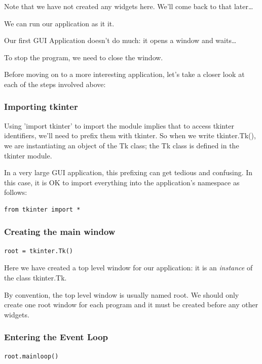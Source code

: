 \documentclass{article}
\begin{document}
Note that we have not created any widgets here.  We’ll come back to that later…

We can run our application as it it.   

Our first GUI Application doesn't do much:  it opens a window and waits…

To stop the program, we need to  close the window.

Before moving on to a more interesting application, let's take a closer look at each of the steps involved above:

\subsubsection{Importing tkinter}

Using 'import tkinter' to import the module implies that to access tkinter identifiers, we'll need to prefix them with tkinter.  So when we write tkinter.Tk(), we are instantiating an object of the Tk class; the Tk class is defined in the tkinter module. 

In a very large GUI application, this prefixing can get tedious and confusing.  In this case, it is OK to import everything into the application's namespace as follows:

\begin{lstlisting}
from tkinter import *
\end{lstlisting}

\subsubsection{Creating the main window}

\begin{lstlisting}
root = tkinter.Tk()
\end{lstlisting}

Here we have created a top level window for our application:  it is an \textit{instance} of the class tkinter.Tk.

By convention, the top level window is usually named root.  We should only create one root window for each program and it must be created before any other widgets. 

\subsubsection{Entering the Event Loop}

\begin{lstlisting}
root.mainloop()
\end{lstlisting}
\end{document}

